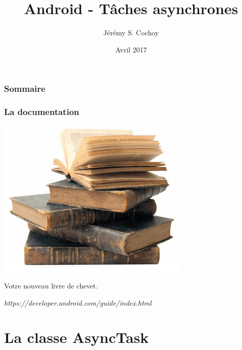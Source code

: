 \documentclass{beamer}
\begin{document}
\title{Android - Tâches asynchrones}
\author{Jérémy S. Cochoy}
\date{Avril 2017}


\begin{frame}
\titlepage
\end{frame}

\begin{frame}
\frametitle{Sommaire}
\tableofcontents
\end{frame}

\begin{frame}
\frametitle{La documentation}
\begin{center}
\includegraphics[scale=0.5]{livres.png}
\end{center}
\begin{block}{Votre nouveau livre de chevet.}
\begin{center}
\emph{https://developer.android.com/guide/index.html}
\end{center}
\end{block}

\end{frame}

\section{La classe AsyncTask}
\end{document}
